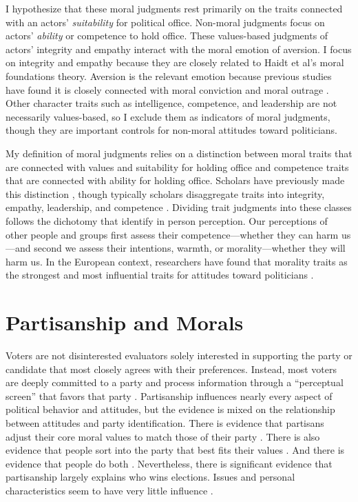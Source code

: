 I hypothesize that these moral judgments rest primarily on the traits connected with an actors' \emph{suitability} for political office. Non-moral judgments focus on actors' \emph{ability} or competence to hold office. These values-based judgments of actors' integrity and empathy interact with the moral emotion of aversion. I focus on integrity and empathy because they are closely related to Haidt et al's \cite{Haidt2012,Grahametal2012} moral foundations theory. Aversion is the relevant emotion because previous studies have found it is closely connected with moral conviction \cite{Petersen2010,SkitkaWisneski2011}and moral outrage \cite{SteenbergenEllis2006}. Other character traits such as intelligence, competence, and leadership are not necessarily values-based, so I exclude them as indicators of moral judgments, though they are important controls for non-moral attitudes toward politicians.

My definition of moral judgments relies on a distinction between moral traits that are connected with values and suitability for holding office and competence traits that are connected with ability for holding office. Scholars have previously made this distinction \cite{Funk1996b,Kinder1986}, though typically scholars disaggregate traits into integrity, empathy, leadership, and competence \cite{Goren2007,Hayes2005}. Dividing trait judgments into these classes follows the dichotomy that  identify in person perception. Our perceptions of other people and groups first assess their competence---whether they can harm us---and second we assess their intentions, warmth, or morality---whether they will harm us. In the European context, researchers have found that morality traits as the strongest and most influential traits for attitudes toward politicians \cite{Wojciszke2005,WojciszkeKlusek1996}.





\section{Partisanship and Morals}
Voters are not disinterested evaluators solely interested in supporting the party or candidate that most closely agrees with their preferences. Instead, most voters are deeply committed to a party and process information through a ``perceptual screen'' that favors that party \cite{Campbelletal1960}. Partisanship influences nearly every aspect of political behavior and attitudes, but the evidence is mixed on the relationship between attitudes and party identification. There is evidence that partisans adjust their core moral values to match those of their party \cite{Goren2005}. There is also evidence that people sort into the party that best fits their values \cite{Levendusky2009a}. And there is evidence that people do both \cite{HightonKam2011}. Nevertheless, there is significant evidence that partisanship largely explains who wins elections. Issues and personal characteristics seem to have very little influence \cite{Bartels2002}.

